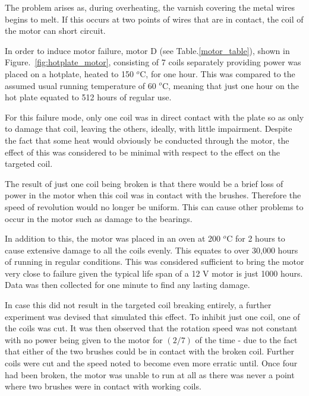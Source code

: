 The problem arises as, during overheating, the varnish covering the metal wires begins to melt. If this occurs at two points of wires that are in contact, the coil of the motor can short circuit.


In order to induce motor failure, motor D (see Table.\ref{motor_table}), shown in Figure.~\ref{fig:hotplate_motor}, consisting of 7 coils separately providing power was placed on a hotplate, heated to 150 $^o$C, for one hour. This was compared to the assumed usual running temperature of 60 $^o$C, meaning that just one hour on the hot plate equated to 512 hours of regular use.

For this failure mode, only one coil was in direct contact with the plate so as only to damage that coil, leaving the others, ideally, with little impairment. Despite the fact that some heat would obviously be conducted through the motor, the effect of this was considered to be minimal with respect to the effect on the targeted coil.

The result of just one coil being broken is that there would be a brief loss of power in the motor when this coil was in contact with the brushes. Therefore the speed of revolution would no longer be uniform. This can cause other problems to occur in the motor such as damage to the bearings. 

In addition to this, the motor was placed in an oven at 200 $^o$C for 2 hours to cause extensive damage to all the coils evenly. This equates to over 30,000 hours of running in regular conditions. This was considered sufficient to bring the motor very close to failure given the typical life span of a 12 V motor is just 1000 hours. %
Data was then collected for one minute to find any lasting damage.

In case this did not result in the targeted coil breaking entirely, a further experiment was devised that simulated this effect. To inhibit just one coil, one of the coils was cut. It was then observed that the rotation speed was not constant with no power being given to the motor for $({2}/{7})$ of the time - due to the fact that either of the two brushes could be in contact with the broken coil. Further coils were cut and the speed noted to become even more erratic until. Once four had been broken, the motor was unable to run at all as there was never a point where two brushes were in contact with working coils.

